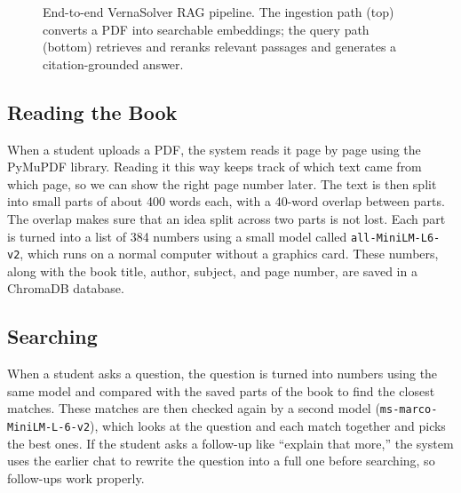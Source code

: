 \documentclass[conference]{IEEEtran}
\begin{document}
\begin{figure}[!t]
{%
}
\caption{End-to-end VernaSolver RAG pipeline. The ingestion path (top)
converts a PDF into searchable embeddings; the query path (bottom)
retrieves and reranks relevant passages and generates a citation-grounded
answer.}
\label{fig:arch}
\end{figure}

\subsection{Reading the Book}
When a student uploads a PDF, the system reads it page by page using the
PyMuPDF library. Reading it this way keeps track of which text came from
which page, so we can show the right page number later. The text is then
split into small parts of about 400 words each, with a 40-word overlap
between parts. The overlap makes sure that an idea split across two parts
is not lost. Each part is turned into a list of 384 numbers using a small
model called \texttt{all-MiniLM-L6-v2}, which runs on a normal computer
without a graphics card. These numbers, along with the book title,
author, subject, and page number, are saved in a ChromaDB database.

\subsection{Searching}
When a student asks a question, the question is turned into numbers using
the same model and compared with the saved parts of the book to find the
closest matches. These matches are then checked again by a second model
(\texttt{ms-marco-MiniLM-L-6-v2}), which looks at the question and each
match together and picks the best ones. If the student asks a follow-up
like ``explain that more,'' the system uses the earlier chat to rewrite
the question into a full one before searching, so follow-ups work
properly.
\end{document}
